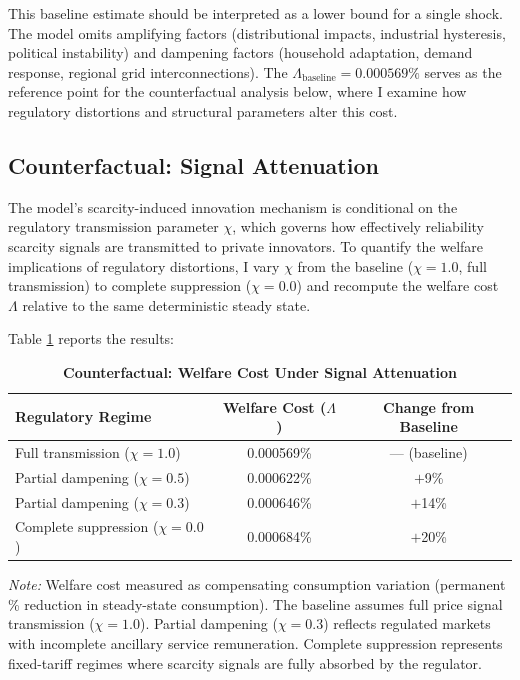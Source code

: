 \documentclass[12pt, a4paper]{article}
\begin{document}
This baseline estimate should be interpreted as a lower bound for a single shock. The model omits amplifying factors (distributional impacts, industrial hysteresis, political instability) and dampening factors (household adaptation, demand response, regional grid interconnections). The $\Lambda_{\text{baseline}} = 0.000569\%$ serves as the reference point for the counterfactual analysis below, where I examine how regulatory distortions and structural parameters alter this cost.

\subsection{Counterfactual: Signal Attenuation}

The model's scarcity-induced innovation mechanism is conditional on the regulatory transmission parameter $\chi$, which governs how effectively reliability scarcity signals are transmitted to private innovators. To quantify the welfare implications of regulatory distortions, I vary $\chi$ from the baseline ($\chi = 1.0$, full transmission) to complete suppression ($\chi = 0.0$) and recompute the welfare cost $\Lambda$ relative to the same deterministic steady state.

Table \ref{tab:counterfactual} reports the results:

\begin{table}[H]
    \centering
    \caption{\textbf{Counterfactual: Welfare Cost Under Signal Attenuation}}
    \label{tab:counterfactual}
    \renewcommand{\arraystretch}{1.3}
    \begin{tabular}{l c c}
        \toprule
        \textbf{Regulatory Regime} & \textbf{Welfare Cost ($\Lambda$)} & \textbf{Change from Baseline} \\
        \midrule
        Full transmission ($\chi = 1.0$) & 0.000569\% & --- (baseline) \\
        Partial dampening ($\chi = 0.5$) & 0.000622\% & $+$9\% \\
        Partial dampening ($\chi = 0.3$) & 0.000646\% & $+$14\% \\
        Complete suppression ($\chi = 0.0$) & 0.000684\% & $+$20\% \\
        \bottomrule
    \end{tabular}
    \vspace{0.2cm}
    \parbox{\textwidth}{\footnotesize \textit{Note:} Welfare cost measured as compensating consumption variation (permanent \% reduction in steady-state consumption). The baseline assumes full price signal transmission ($\chi = 1.0$). Partial dampening ($\chi = 0.3$) reflects regulated markets with incomplete ancillary service remuneration. Complete suppression represents fixed-tariff regimes where scarcity signals are fully absorbed by the regulator.}
\end{table}
\end{document}
